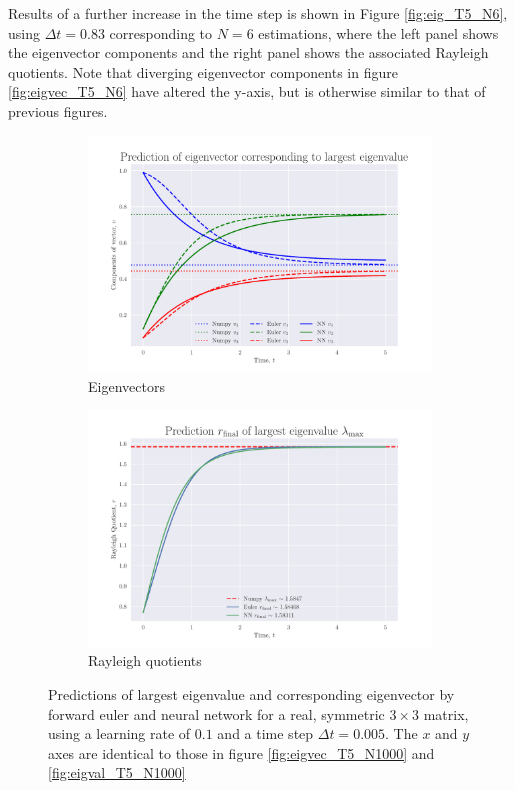 \documentclass[12pt]{extarticle}
\begin{document}
Results of a further increase in the time step is shown in Figure \ref{fig:eig_T5_N6}, using $\Delta t= 0.83$ corresponding to $N=6$ estimations, where the left panel shows the eigenvector components and the right panel shows the associated Rayleigh quotients. Note that diverging eigenvector components in figure \ref{fig:eigvec_T5_N6} have altered the y-axis, but is otherwise similar to that of previous figures. 

\begin{figure}[h]
	
	\centering
	\begin{subfigure}{0.49\textwidth}
		\centering
		\includegraphics[width=\textwidth]{../output/plots/eigvec_T5_N1000_eta01.pdf}
		\caption{Eigenvectors}
		\label{fig:eigvec_T5_N1000_eta01}
	\end{subfigure}
	\hfill
	\begin{subfigure}{0.49\textwidth}
		\centering
		\includegraphics[width=\textwidth]{../output/plots/eigval_T5_N1000_eta01.pdf}
		\caption{Rayleigh quotients}
		\label{fig:eigval_T5_N1000_eta01}
	\end{subfigure}
	\caption{Predictions of largest eigenvalue and corresponding eigenvector by forward euler and neural network for a real, symmetric $3\times 3$ matrix, using a learning rate of $0.1$ and a time step $\Delta t = 0.005$. The $x$ and $y$ axes are identical to those in figure \ref{fig:eigvec_T5_N1000} and \ref{fig:eigval_T5_N1000}}
	\label{fig:eig_T5_N1000_eta01}
\end{figure}
\end{document}
